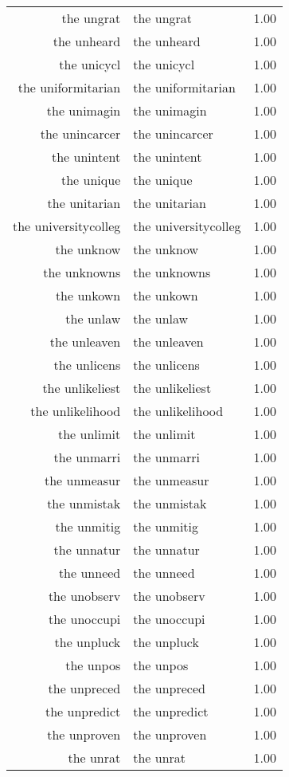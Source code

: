 \begin{table}[ht]
\begin{tabular}{rlr}
  the ungrat & the ungrat & 1.00 \\ 
  the unheard & the unheard & 1.00 \\ 
  the unicycl & the unicycl & 1.00 \\ 
  the uniformitarian & the uniformitarian & 1.00 \\ 
  the unimagin & the unimagin & 1.00 \\ 
  the unincarcer & the unincarcer & 1.00 \\ 
  the unintent & the unintent & 1.00 \\ 
  the unique & the unique & 1.00 \\ 
  the unitarian & the unitarian & 1.00 \\ 
  the universitycolleg & the universitycolleg & 1.00 \\ 
  the unknow & the unknow & 1.00 \\ 
  the unknowns & the unknowns & 1.00 \\ 
  the unkown & the unkown & 1.00 \\ 
  the unlaw & the unlaw & 1.00 \\ 
  the unleaven & the unleaven & 1.00 \\ 
  the unlicens & the unlicens & 1.00 \\ 
  the unlikeliest & the unlikeliest & 1.00 \\ 
  the unlikelihood & the unlikelihood & 1.00 \\ 
  the unlimit & the unlimit & 1.00 \\ 
  the unmarri & the unmarri & 1.00 \\ 
  the unmeasur & the unmeasur & 1.00 \\ 
  the unmistak & the unmistak & 1.00 \\ 
  the unmitig & the unmitig & 1.00 \\ 
  the unnatur & the unnatur & 1.00 \\ 
  the unneed & the unneed & 1.00 \\ 
  the unobserv & the unobserv & 1.00 \\ 
  the unoccupi & the unoccupi & 1.00 \\ 
  the unpluck & the unpluck & 1.00 \\ 
  the unpos & the unpos & 1.00 \\ 
  the unpreced & the unpreced & 1.00 \\ 
  the unpredict & the unpredict & 1.00 \\ 
  the unproven & the unproven & 1.00 \\ 
  the unrat & the unrat & 1.00 \\ 

\end{tabular}
\end{table}
